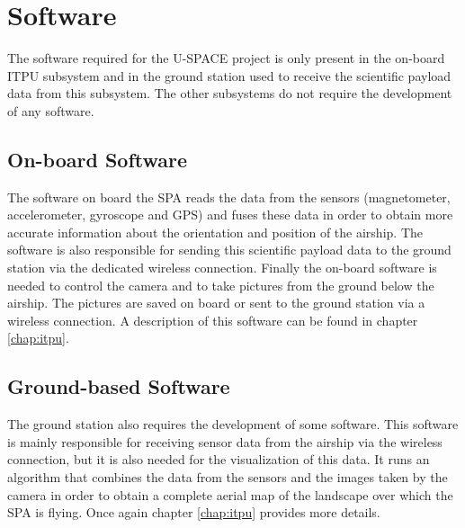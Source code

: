 \section{Software}
\label{sec:intro_software}

\enlargethispage{2.0em}

The software required for the \ac{U-SPACE} project is only present in the on-board \ac{ITPU} subsystem and in the ground station used to receive the scientific payload data from this subsystem. The other subsystems do not require the development of any software. %
%

\subsection{On-board Software}

The software on board the \ac{SPA} reads the data from the sensors (magnetometer, accelerometer, gyroscope and \ac{GPS}) and fuses these data in order to obtain more accurate information about the orientation and position of the airship. The software is also responsible for sending this scientific payload data to the ground station via the dedicated wireless connection. Finally the on-board software is needed to control the camera and to take pictures from the ground below the airship. The pictures are saved on board or sent to the ground station via a wireless connection. A description of this software can be found in chapter \ref{chap:itpu}.

\subsection{Ground-based Software}

The ground station also requires the development of some software. This software is mainly responsible for receiving sensor data from the airship via the wireless connection, but it is also needed for the visualization of this data. It runs an algorithm that combines the data from the sensors and the images taken by the camera in order to obtain a complete aerial map of the landscape over which the \ac{SPA} is flying. Once again chapter \ref{chap:itpu} provides more details.

